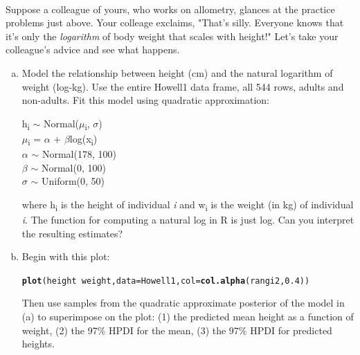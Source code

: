 \documentclass[12pt]{article}\usepackage[]{graphicx}\usepackage[]{color}
\makeatletter
\newcommand{\hlnum}[1]{\textcolor[rgb]{0.686,0.059,0.569}{#1}}%
\newcommand{\hlopt}[1]{\textcolor[rgb]{0,0,0}{#1}}%
\newcommand{\hlstd}[1]{\textcolor[rgb]{0.345,0.345,0.345}{#1}}%
\newcommand{\hlkwc}[1]{\textcolor[rgb]{0.333,0.667,0.333}{#1}}%
\newcommand{\hlkwd}[1]{\textcolor[rgb]{0.737,0.353,0.396}{\textbf{#1}}}%
\newenvironment{kframe}{%
 \def\at@end@of@kframe{}%
 \ifinner\ifhmode%
  \def\at@end@of@kframe{\end{minipage}}%
  \begin{minipage}{\columnwidth}%
 \fi\fi%
 \def\FrameCommand##1{\hskip\@totalleftmargin \hskip-\fboxsep
 \colorbox{shadecolor}{##1}\hskip-\fboxsep
     \hskip-\linewidth \hskip-\@totalleftmargin \hskip\columnwidth}%
 \MakeFramed {\advance\hsize-\width
   \@totalleftmargin\z@ \linewidth\hsize
   \@setminipage}}%
 {\par\unskip\endMakeFramed%
 \at@end@of@kframe}
\newenvironment{knitrout}{}{} %
\newenvironment{problem}[2][Problem]{\begin{trivlist}
\item[\hskip \labelsep {\bfseries #1}\hskip \labelsep {\bfseries #2.}]}{\end{trivlist}}
\makeatother
\begin{document}
\begin{problem}{4H3}
\text{}\\
Suppose a colleague of yours, who works on allometry, glances at the practice problems just above. Your colleage exclaims, "That's silly. Everyone knows that it's only the \textit{logarithm} of body weight that scales with height!" Let's take your colleague's advice and see what happens.
\begin{enumerate}[(a)]
\item Model the relationship between height (cm) and the natural logarithm of weight (log-kg). Use the entire Howell1 data frame, all 544 rows, adults and non-adults. Fit this model using quadratic approximation:
\begin{center}
h\textsubscript{i} $\sim$ Normal($\mu$\textsubscript{i}, $\sigma$)\\
$\mu$\textsubscript{i} = $\alpha$ + $\beta$log(x\textsubscript{i})\\
$\alpha$ $\sim$ Normal(178, 100)\\
$\beta$ $\sim$ Normal(0, 100)\\
$\sigma$ $\sim$ Uniform(0, 50)
\end{center}
where h\textsubscript{i} is the height of individual \textit{i} and w\textsubscript{i} is the weight (in kg) of individual \textit{i}. The function for computing a natural log in R is just log. Can you interpret the resulting estimates?
\item Begin with this plot:

\begin{knitrout}
\color{fgcolor}\begin{kframe}
\begin{alltt}
\hlkwd{plot}\hlstd{(height} \hlopt{~} \hlstd{weight,} \hlkwc{data} \hlstd{= Howell1,} \hlkwc{col} \hlstd{=} \hlkwd{col.alpha}\hlstd{(rangi2,}\hlnum{0.4}\hlstd{))}
\end{alltt}
\end{kframe}
\end{knitrout}

Then use samples from the quadratic approximate posterior of the model in (a) to superimpose on the plot: (1) the predicted mean height as a function of weight, (2) the 97\% HPDI for the mean, (3) the 97\% HPDI for predicted heights.
\end{enumerate}
\end{problem}
\end{document}

